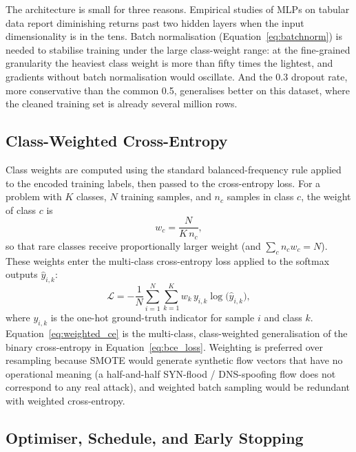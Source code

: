 \par The architecture is small for three reasons. Empirical studies of MLPs on tabular data report diminishing returns past two hidden layers when the input dimensionality is in the tens. Batch normalisation (Equation~\ref{eq:batchnorm}) is needed to stabilise training under the large class-weight range: at the fine-grained granularity the heaviest class weight is more than fifty times the lightest, and gradients without batch normalisation would oscillate. And the 0.3 dropout rate, more conservative than the common 0.5, generalises better on this dataset, where the cleaned training set is already several million rows.

\subsection{Class-Weighted Cross-Entropy}
\label{subsec:class_weighted_ce}

\par Class weights are computed using the standard balanced-frequency rule applied to the encoded training labels, then passed to the cross-entropy loss. For a problem with $K$ classes, $N$ training samples, and $n_c$ samples in class $c$, the weight of class $c$ is
\begin{equation}
    w_c = \frac{N}{K \, n_c},
    \label{eq:balanced_weights}
\end{equation}
so that rare classes receive proportionally larger weight (and $\sum_c n_c w_c = N$). These weights enter the multi-class cross-entropy loss applied to the softmax outputs $\hat{y}_{i,k}$:
\begin{equation}
    \mathcal{L} = -\frac{1}{N} \sum_{i=1}^{N} \sum_{k=1}^{K} w_{k}\, y_{i,k} \log\!\big(\hat{y}_{i,k}\big),
    \label{eq:weighted_ce}
\end{equation}
where $y_{i,k}$ is the one-hot ground-truth indicator for sample $i$ and class $k$. Equation~\eqref{eq:weighted_ce} is the multi-class, class-weighted generalisation of the binary cross-entropy in Equation~\eqref{eq:bce_loss}. Weighting is preferred over resampling because SMOTE would generate synthetic flow vectors that have no operational meaning (a half-and-half SYN-flood / DNS-spoofing flow does not correspond to any real attack), and weighted batch sampling would be redundant with weighted cross-entropy.

\subsection{Optimiser, Schedule, and Early Stopping}
\label{subsec:training_loop}

